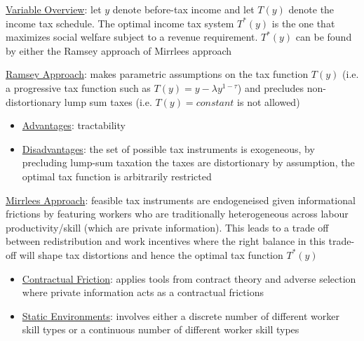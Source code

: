 \documentclass{article}
\begin{document}
\vspace{2.5mm}
\par \underline{Variable Overview}: let $y$ denote before-tax income and let $T(y)$ denote the income tax schedule. The optimal income tax system $T^{*}(y)$ is the one that maximizes social welfare subject to a revenue requirement. $T^{*}(y)$ can be found by either the Ramsey approach of Mirrlees approach
\vspace{2.5mm}
\par \underline{Ramsey Approach}: makes parametric assumptions on the tax function $T(y)$ (i.e. a progressive tax function such as $T(y) = y - \lambda y^{1-\tau}$) and precludes non-distortionary lump sum taxes (i.e. $T(y) = constant$ is not allowed)
\begin{itemize}
    \item  \underline{Advantages}: tractability
    \item  \underline{Disadvantages}: the set of possible tax instruments is exogeneous, by precluding lump-sum taxation the taxes are distortionary by assumption, the optimal tax function is arbitrarily restricted
\end{itemize}
\vspace{2.5mm}
\par \underline{Mirrlees Approach}: feasible tax instruments are endogeneised given informational frictions by featuring workers who are traditionally heterogeneous across labour productivity/skill (which are private information). This leads to a trade off between redistribution and work incentives where the right balance in this trade-off will shape tax distortions and hence the optimal tax function $T^{*}(y)$
\begin{itemize}
    \item  \underline{Contractual Friction}: applies tools from contract theory and adverse selection where private information acts as a contractual frictions
    \item  \underline{Static Environments}: involves either a discrete number of different worker skill types or a continuous number of different worker skill types
\end{itemize}
\end{document}

